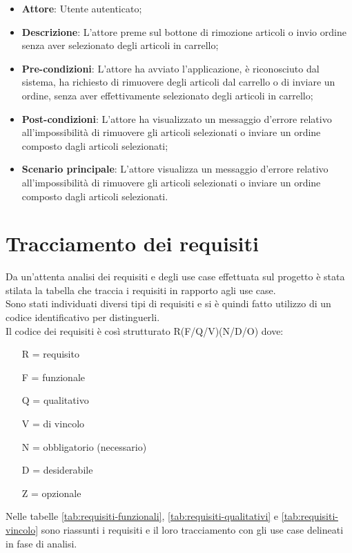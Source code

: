 \begin{itemize}
	\item \textbf{Attore}: Utente autenticato;
	\item \textbf{Descrizione}: L'attore preme sul bottone di rimozione articoli o invio ordine senza aver selezionato degli articoli in carrello;
	\item \textbf{Pre-condizioni}: L'attore ha avviato l'applicazione, è riconosciuto dal sistema, ha richiesto di rimuovere degli articoli dal carrello o di inviare un ordine, senza aver effettivamente selezionato degli articoli in carrello;
	\item \textbf{Post-condizioni}: L'attore ha visualizzato un messaggio d'errore relativo all'impossibilità di rimuovere gli articoli selezionati o inviare un ordine composto dagli articoli selezionati;
	\item \textbf{Scenario principale}: L'attore visualizza un messaggio d'errore relativo all'impossibilità di rimuovere gli articoli selezionati o inviare un ordine composto dagli articoli selezionati.
\end{itemize}

\section{Tracciamento dei requisiti}

Da un'attenta analisi dei requisiti e degli use case effettuata sul progetto è stata stilata la tabella che traccia i requisiti in rapporto agli use case.\\
Sono stati individuati diversi tipi di requisiti e si è quindi fatto utilizzo di un codice identificativo per distinguerli.\\
Il codice dei requisiti è così strutturato R(F/Q/V)(N/D/O) dove:
\begin{enumerate}
	\item[R =] requisito
    \item[F =] funzionale
    \item[Q =] qualitativo
    \item[V =] di vincolo
    \item[N =] obbligatorio (necessario)
    \item[D =] desiderabile
    \item[Z =] opzionale
\end{enumerate}
Nelle tabelle \ref{tab:requisiti-funzionali}, \ref{tab:requisiti-qualitativi} e \ref{tab:requisiti-vincolo} sono riassunti i requisiti e il loro tracciamento con gli use case delineati in fase di analisi.

